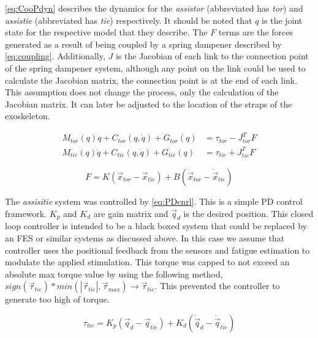 \autoref{eq:CooPdyn} describes the dynamics for the \textit{assistor} (abbreviated has \textit{tor}) and \textit{assistie} (abbreviated has \textit{tie}) respectively.  It should be noted that $q$ is the joint state for the respective model that they describe. The $F$ terms are the forces generated as a result of being coupled by a spring dampener described by \autoref{eq:coupling}. Additionally, $J$ is the Jacobian of each link to the connection point of the spring dampener system, although any point on the link could be used to calculate the Jacobian matrix, the connection point is at the end of each link. This assumption does not change the process, only the calculation of the Jacobian matrix. It can later be adjusted to the location of the straps of the exoskeleton.

\begin{equation} 
\begin{aligned}
    M_{tor}(q) \ddot{q} + C_{tor} (q,\dot{q}) + G_{tor}(q) &= \tau_{tor} - J_{tor}^T F \\
    M_{tie}(q) \ddot{q} + C_{tie} (q,\dot{q}) + G_{tie}(q) &= \tau_{tie} + J_{tie}^T F
\end{aligned}
    \label{eq:CooPdyn}
\end{equation}

\begin{equation}
    F = K ( \vec{x}_{tor} - \vec{x}_{tie} ) + B (\dot{ \vec{x}}_{tor} - \dot{ \vec{x}}_{tie} ) 
    \label{eq:coupling}
\end{equation}


The \textit{assisitie} system was controlled by \autoref{eq:PDcnrl}. This is a simple PD control framework. $K_p$ and $K_d$ are gain matrix and $\vec{q}_d$ is the desired position. This closed loop controller is intended to be a black boxed system that could be replaced by an FES or similar systems as discussed above. In this case we assume that controller uses the positional feedback from the sensors and fatigue estimation to modulate the applied stimulation. This torque was capped to not exceed an absolute max torque value by using the following method, $ sign(\vec{\tau}_{tie})* min( | \vec{\tau}_{tie}|, \vec{\tau}_{max}) \rightarrow \vec{\tau}_{tie} $.  This prevented the controller to generate too high of torque. 

\begin{equation}
        \tau_{tie} = K_p( \vec{q}_d - \vec{q}_{tie} ) + K_d ( \dot{\vec{q}}_d - \dot{\vec{q}}_{tie} ) 
    \label{eq:PDcnrl}
\end{equation}

